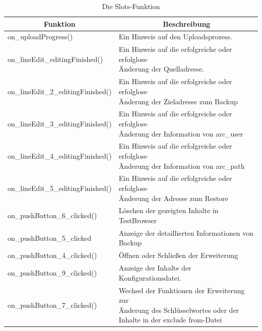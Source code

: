 \begin{table}[h!]
	\caption{Die Slots-Funktion}
	\label{Table1}
	\centering     %
	\begin{tabular}{|l|l|}
		\hline
		\multicolumn{1}{|c|}{\textbf{Funktion}}    & \multicolumn{1}{c|}{\textbf{Beschreibung}}                                              \\ \hline
		on\_uploadProgress()                       & Ein Hinweis auf den Uploadsprozess.                                                      \\ \hline
		on\_lineEdit\_editingFinished()            &  \makecell[l]{Ein Hinweis auf die erfolgreiche oder erfolglose\\Änderung der Quelladresse.}             \\ \hline
		on\_lineEdit\_2\_editingFinished()         & \makecell[l] {Ein Hinweis auf die erfolgreiche oder erfolglose\\ Änderung der Zieladresse zum Backup}    \\ \hline
		on\_lineEdit\_3\_editingFinished()         &\makecell[l]{Ein Hinweis auf die erfolgreiche oder erfolglose\\ Änderung der Information von arc\_user}  \\ \hline
		on\_lineEdit\_4\_editingFinished()         &\makecell[l]{Ein Hinweis auf die erfolgreiche oder erfolglose \\Änderung der Information von arc\_path}  \\ \hline
		on\_lineEdit\_5\_editingFinished()         & \makecell[l]{Ein Hinweis auf die erfolgreiche oder erfolglose \\Änderung der Adresse zum Restore  }     \\ \hline
		on\_pushButton\_6\_clicked()               & Löschen der gezeigten Inhalte in TestBrowser                                            \\ \hline
		on\_pushButton\_5\_clicked                 & \makecell[l]{Anzeige der detaillierten Informationen von \\Backup}                                      \\ \hline
		on\_pushButton\_4\_clicked()               & Öffnen oder Schließen der Erweiterung                                                   \\ \hline
		on\_pushButton\_9\_clicked()               & Anzeige der Inhalte der Konfigurationsdatei.                                            \\ \hline
		on\_pushButton\_7\_clicked() &\makecell[l]{Wechsel der Funktionen der Erweiterung zur \\Änderung des Schlüsselwortes oder der \\Inhalte in der exclude from-Datei}  \\ \hline

\end{tabular}
\end{table}
